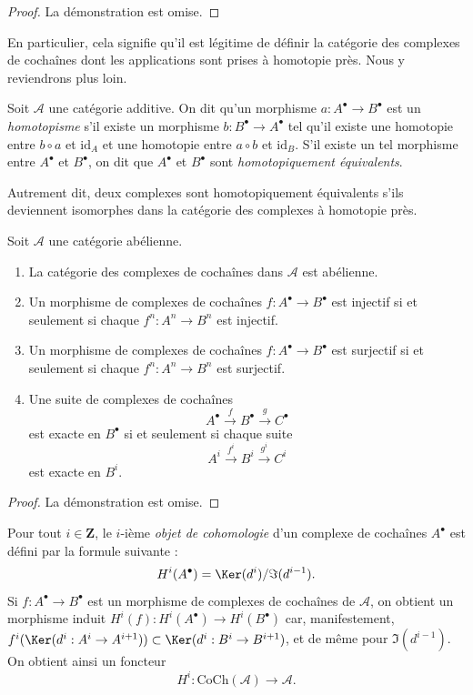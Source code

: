 \begin{proof}
La démonstration est omise.
\end{proof}

\noindent
En particulier, cela signifie qu'il est légitime de définir
la catégorie des complexes de cochaînes dont les applications sont prises à homotopie près.
Nous y reviendrons plus loin.

\begin{definition}
\label{definition-homotopy-equivalent-cochain}
Soit $\mathcal{A}$ une catégorie additive.
On dit qu'un morphisme $a : A^\bullet \to B^\bullet$
est un {\it homotopisme} s'il existe
un morphisme $b : B^\bullet \to A^\bullet$
tel qu'il existe une homotopie entre
$b \circ a$ et $\text{id}_A$
et une homotopie entre $a \circ b$ et $\text{id}_B$.
S'il existe un tel morphisme entre $A^\bullet$ et $B^\bullet$, on
dit que $A^\bullet$ et $B^\bullet$ sont {\it homotopiquement équivalents}.
\end{definition}

\noindent
Autrement dit, deux complexes sont homotopiquement équivalents s'ils deviennent
isomorphes dans la catégorie des complexes à homotopie près.

\begin{lemma}
\label{lemma-cat-cochain-abelian}
Soit $\mathcal{A}$ une catégorie abélienne.
\begin{enumerate}
\item La catégorie des complexes de cochaînes dans $\mathcal{A}$ est
abélienne.
\item Un morphisme de complexes de cochaînes
$f : A^\bullet \to B^\bullet$ est injectif
si et seulement si chaque $f^n : A^n \to B^n$ est injectif.
\item Un morphisme de complexes de cochaînes
$f : A^\bullet \to B^\bullet$ est surjectif
si et seulement si chaque $f^n : A^n \to B^n$ est surjectif.
\item Une suite de complexes de cochaînes
$$
A^\bullet \xrightarrow{f} B^\bullet \xrightarrow{g} C^\bullet
$$
est exacte en $B^\bullet$ si et seulement si chaque suite
$$
A^i \xrightarrow{f^i} B^i \xrightarrow{g^i} C^i
$$
est exacte en $B^i$.
\end{enumerate}
\end{lemma}

\begin{proof}
La démonstration est omise.
\end{proof}

\noindent
Pour tout $i \in \mathbf{Z}$, le $i$-ième {\it objet de cohomologie}
d'un complexe de cochaînes $A^\bullet$ est défini par
la formule suivante :
$$
H^i(A^\bullet) = \Ker(d^i)/\Im(d^{i - 1}).
$$
Si $f : A^\bullet \to B^\bullet$ est un morphisme de complexes de cochaînes
de $\mathcal{A}$, on obtient un
morphisme induit $H^i(f) : H^i(A^\bullet) \to H^i(B^\bullet)$
car, manifestement,
$f^i(\Ker(d^i : A^i \to A^{i + 1})) \subset
\Ker(d^i : B^i \to B^{i + 1})$, et de même
pour $\Im(d^{i - 1})$.
On obtient ainsi un foncteur
$$
H^i : \text{CoCh}(\mathcal{A}) \longrightarrow \mathcal{A}.
$$

